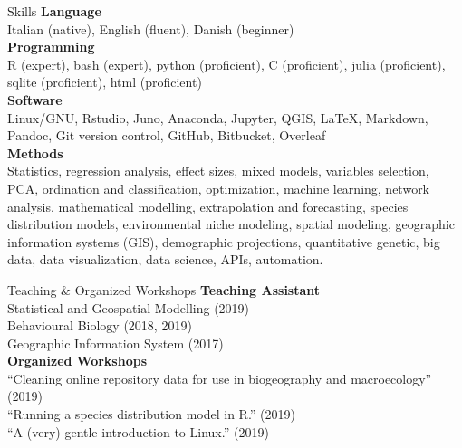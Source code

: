 \documentclass{resume} %
\begin{document}
\begin{rSection}{Skills}
{\bf Language}\\
Italian (native), English (fluent), Danish (beginner)\\
{\bf Programming}\\
R (expert), bash (expert), python (proficient), C (proficient), julia (proficient), sqlite (proficient), html (proficient)\\
{\bf Software} \\
Linux/GNU, Rstudio, Juno, Anaconda, Jupyter, QGIS, \LaTeX, Markdown, Pandoc, Git version control, GitHub, Bitbucket, Overleaf\\
{\bf Methods} \\
Statistics, regression analysis, effect sizes, mixed models, variables selection, PCA, ordination and classification, optimization, machine learning, network analysis, mathematical modelling, extrapolation and forecasting, species distribution models, environmental niche modeling, spatial modeling, geographic information systems (GIS), demographic projections, quantitative genetic, big data, data visualization, data science, APIs, automation. 
\end{rSection}

\begin{rSection}{Teaching \& Organized Workshops}
{\bf Teaching Assistant} \\
Statistical and Geospatial Modelling (2019)\\
Behavioural Biology (2018, 2019)\\
Geographic Information System (2017)\\
{\bf Organized Workshops}\\
``Cleaning online repository data for use in biogeography and macroecology'' (2019)\\
``Running a species distribution model in R.'' (2019)\\
``A (very) gentle introduction to Linux.'' (2019)
\end{rSection}


\end{document}
